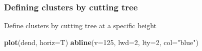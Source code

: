 \documentclass[]{book}
\newenvironment{Shaded}{\begin{snugshade}}{\end{snugshade}}
\newcommand{\KeywordTok}[1]{\textcolor[rgb]{0.13,0.29,0.53}{\textbf{{#1}}}}
\newcommand{\DataTypeTok}[1]{\textcolor[rgb]{0.13,0.29,0.53}{{#1}}}
\newcommand{\DecValTok}[1]{\textcolor[rgb]{0.00,0.00,0.81}{{#1}}}
\newcommand{\StringTok}[1]{\textcolor[rgb]{0.31,0.60,0.02}{{#1}}}
\newcommand{\NormalTok}[1]{{#1}}
\theoremstyle{definition}
\theoremstyle{definition}
\theoremstyle{definition}
\theoremstyle{remark}
\begin{document}
\subsubsection{Defining clusters by cutting
tree}\label{defining-clusters-by-cutting-tree}

Define clusters by cutting tree at a specific height

\begin{Shaded}
\begin{Highlighting}[]
\KeywordTok{plot}\NormalTok{(dend, }\DataTypeTok{horiz=}\NormalTok{T)}
\KeywordTok{abline}\NormalTok{(}\DataTypeTok{v=}\DecValTok{125}\NormalTok{, }\DataTypeTok{lwd=}\DecValTok{2}\NormalTok{, }\DataTypeTok{lty=}\DecValTok{2}\NormalTok{, }\DataTypeTok{col=}\StringTok{"blue"}\NormalTok{)}
\end{Highlighting}
\end{Shaded}
\end{document}

